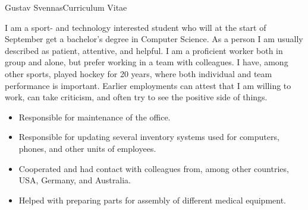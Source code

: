 \documentclass{article}
\begin{document}


\begin{cv}{Gustav Svennas}{Curriculum Vitae}


I am a sport- and technology interested student who will at the start of September get a bachelor's degree in Computer Science. As a person I am usually described as patient, attentive, and helpful. I am a proficient worker both in group and alone, but prefer working in a team with colleagues. I have, among other sports, played hockey for 20 years, where both individual and team performance is important. Earlier employments can attest that I am willing to work, can take criticism, and often try to see the positive side of things.  



\begin{cvevent}[2022-07][2022-08]
    \begin{itemize}
        \item Responsible for maintenance of the office.
    \end{itemize}
\end{cvevent}


\begin{cvevent}[2021-03][2021-10]
    \begin{itemize}
        \item Responsible for updating several inventory systems used for computers, phones, and other units of employees. 
        \item Cooperated and had contact with colleagues from, among other countries, USA, Germany, and Australia.
    \end{itemize}
\end{cvevent}


\begin{cvevent}[2015-06][2015-07]
    \begin{itemize}
        \item Helped with preparing parts for assembly of different medical equipment.
    \end{itemize}
\end{cvevent}


\end{cv}
\end{document}

